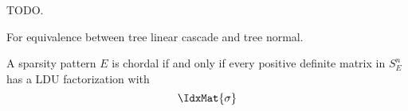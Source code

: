 

TODO.

For equivalence between tree linear cascade and tree normal.


\begin{prop}
A sparsity pattern $E$ is chordal if and only if every positive definite matrix in $S_{E}^{n}$ has a LDU factorization with
$$
  \IdxMat{\sigma}
$$
\end{prop}
